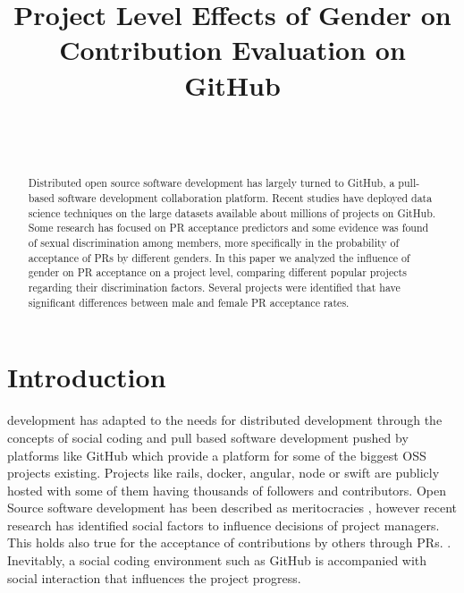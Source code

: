 


\title{Project Level Effects of Gender on Contribution Evaluation on GitHub}

\author{
	\\
	\\
	}

\maketitle

\begin{abstract}%

Distributed open source software development has largely turned to GitHub, a pull-based software development collaboration platform. Recent studies have deployed data science techniques on the large datasets available about millions of projects on GitHub. Some research has focused on \ac{PR} acceptance predictors and some evidence was found of sexual discrimination among members, more specifically in the probability of acceptance of \ac{PR}s by different genders. In this paper we analyzed the influence of gender on \ac{PR} acceptance on a project level, comparing different popular projects regarding their discrimination factors. Several projects were identified that have significant differences between male and female \ac{PR} acceptance rates.
\end{abstract}


\section{Introduction}\label{Introduction}

 development has adapted to the needs for distributed development through the concepts of social coding and pull based software development pushed by platforms like GitHub which provide a platform for some of the biggest \ac{OSS} projects existing. Projects like rails, docker, angular, node or swift are publicly hosted with some of them having thousands of followers and contributors. Open Source software development has been described as meritocracies \cite{Scacchi:2007:FSS:1295014.1295019}, however recent research has identified social factors to influence decisions of project managers. This holds also true for the acceptance of contributions by others through \ac{PR}s. \cite{Tsay:2014:IST:2568225.2568315}. Inevitably, a social coding environment such as GitHub is accompanied with social interaction that influences the project progress.

